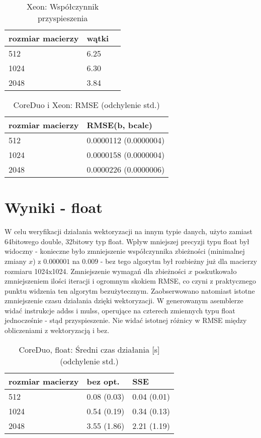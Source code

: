 \documentclass[11pt,a4paper]{article}
\begin{document}
\begin{table}[h!]
\begin{center}
\begin{tabular}{lll}
\toprule
rozmiar macierzy &  wątki \\
\midrule
512 & 6.25 \\
1024 & 6.30 \\
2048 & 3.84 \\
\bottomrule
\end{tabular}
\caption{Xeon: Współczynnik przyspieszenia}
\end{center}
\end{table}

\begin{table}[h!]
\begin{center}
\begin{tabular}{ll}
\toprule
rozmiar macierzy & RMSE(b, bcalc) \\
\midrule
512  & 0.0000112 (0.0000004)  \\
1024 & 0.0000158 (0.0000004)  \\
2048 & 0.0000226 (0.0000006)  \\
\bottomrule
\end{tabular}
\caption{CoreDuo i Xeon: RMSE (odchylenie std.)}
\end{center}
\end{table}

\section{Wyniki - float}
W celu weryfikacji działania wektoryzacji na innym typie danych, użyto zamiast 64bitowego double, 32bitowy typ float. Wpływ mniejszej precyzji typu float był widoczny - konieczne było zmniejszenie współczynnika zbieżności (minimalnej zmiany $x$) z $0.000001$ na $0.009$ - bez tego algorytm był rozbieżny już dla macierzy rozmiaru 1024x1024. Zmniejszenie wymagań dla zbieżności $x$ poskutkowało zmniejszeniem ilości iteracji i ogromnym skokiem RMSE, co czyni z praktycznego punktu widzenia ten algorytm bezużytecznym. Zaobserwowano natomiast istotne zmniejszenie czasu działania dzięki wektoryzacji. W generowanym asemblerze widać instrukcje addss i mulss, operujące na czterech zmiennych typu float jednocześnie - stąd przyspieszenie. Nie widać istotnej różnicy w RMSE między obliczeniami z wektoryzacją i bez.

\begin{table}[h!]
\begin{center}
\begin{tabular}{lll}
\toprule
rozmiar macierzy & bez opt. &  SSE \\
\midrule
512  & 0.08 (0.03) & 0.04 (0.01) \\
1024 & 0.54 (0.19) & 0.34 (0.13) \\
2048 & 3.55 (1.86) & 2.21 (1.19) \\
\bottomrule
\end{tabular}
\caption{CoreDuo, float: Średni czas działania [s] (odchylenie std.)}
\end{center}
\end{table}
\end{document}
